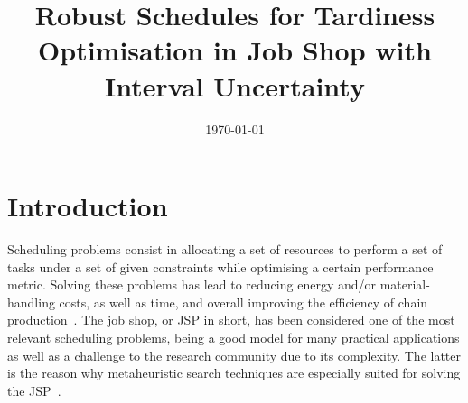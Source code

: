 \documentclass[12pt,halfline,a4paper]{ouparticle}
\begin{document}

\title{Robust Schedules for Tardiness Optimisation in Job Shop with Interval Uncertainty} 

\author{%
\address{Dep. of Computing, University of Oviedo, Spain}
\and
{}
\address{Dep. of Computing, University of Oviedo, Spain}
\and
{}
\address{Dep. of Computing, University of Oviedo, Spain}
\and
{}
\address{Dep. of Computing, University of Oviedo, Spain}
\and
{}
\address{Dep. of Maths, Stats and Computing, University of Cantabria, Spain}
}
%


\date{\today}



\maketitle              %


\section{Introduction}\label{SecIntro}
Scheduling problems consist in allocating a set of resources to perform a set of tasks under a set of given constraints while optimising a certain performance metric. Solving these problems has lead to reducing energy and/or material-handling costs, as well as time, and overall improving the efficiency of chain production~\cite{Liqat2017,Pinedo2016}. The job shop, or JSP in short, has been considered one of the most relevant scheduling problems, being a good model for many practical applications as well as a challenge to the research community due to its complexity. The latter is the reason why metaheuristic search techniques are especially suited for solving the JSP~\cite{Zhang2019Jian}.
\end{document}
